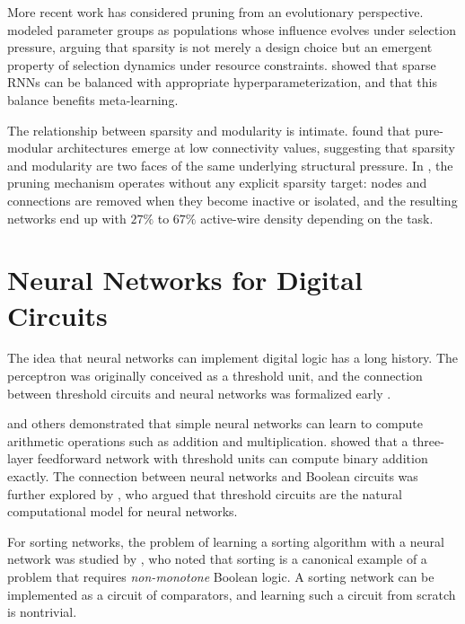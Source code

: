 More recent work has considered pruning from an evolutionary
perspective. \citet{shah2026pruning} modeled parameter groups as
populations whose influence evolves under selection pressure, arguing
that sparsity is not merely a design choice but an emergent property of
selection dynamics under resource constraints.
\citet{hershey2025balancing} showed that sparse RNNs can be balanced
with appropriate hyperparameterization, and that this balance benefits
meta-learning.

The relationship between sparsity and modularity is intimate.
\citet{landassuri2012evolution} found that pure-modular architectures
emerge at low connectivity values, suggesting that sparsity and
modularity are two faces of the same underlying structural pressure. In
\modnet{}, the pruning mechanism operates without any explicit sparsity
target: nodes and connections are removed when they become inactive or
isolated, and the resulting networks end up with $27\%$ to $67\%$
active-wire density depending on the task.

\section{Neural Networks for Digital Circuits}
\label{sec:related-circuits}

The idea that neural networks can implement digital logic has a long
history. The perceptron \citep{rosenblatt1958perceptron} was originally
conceived as a threshold unit, and the connection between threshold
circuits and neural networks was formalized early
\citep{minsky1969perceptrons}.

\citet{hajek1990adder} and others demonstrated that simple neural
networks can learn to compute arithmetic operations such as addition and
multiplication. \citet{siu1991adder} showed that a three-layer
feedforward network with threshold units can compute binary addition
exactly. The connection between neural networks and Boolean circuits was
further explored by \citet{siu1995discrete}, who argued that
threshold circuits are the natural computational model for neural
networks.

For sorting networks, the problem of learning a sorting algorithm with
a neural network was studied by \citet{knuth1998sorting}, who noted
that sorting is a canonical example of a problem that requires
\emph{non-monotone} Boolean logic. A sorting network can be implemented
as a circuit of comparators, and learning such a circuit from scratch
is nontrivial.

